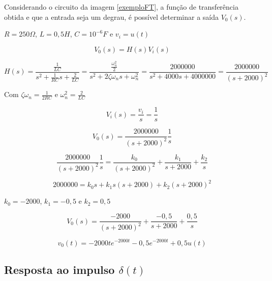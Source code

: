 \documentclass[12pt,fleqn]{book} %
\begin{document}
    \begin{example}

Considerando o circuito da imagem \ref{exemploFT}, a função de transferência obtida e que a entrada seja um degrau, é possível determinar a saída $V_0(s)$.

$R = 250\Omega$, $L=0,5H$, $C=10^{-6}F$ e $v_i = u(t)$

\begin{equation}
V_0(s) = H(s)V_i(s)
\end{equation}

\begin{equation}
H(s) = \frac{\frac{1}{LC}}{s^2+\frac{1}{RC}s+\frac{2}{LC}} = \frac{\frac{\omega_n^2}{2}}{s^2+2\zeta\omega_ns+\omega_n^2} = \frac{2000000}{s^2+4000s+4000000} = \frac{2000000}{(s+2000)^2}
\end{equation}

Com $\zeta\omega_n = \frac{1}{2RC}$ e $\omega_n^2 = \frac{2}{LC}$

\begin{equation}
V_i(s) = \frac{v_i}{s} = \frac{1}{s}
\end{equation}

\begin{equation}
V_0(s) = \frac{2000000}{(s+2000)^2}\frac{1}{s}
\end{equation}

\begin{equation}
\frac{2000000}{(s+2000)^2}\frac{1}{s} = \frac{k_0}{(s+2000)^2}+\frac{k_1}{s+2000} + \frac{k_2}{s}
\end{equation}

\begin{equation}
2000000 = k_0s + k_1s(s+2000) + k_2(s+2000)^2
\end{equation}

$k_0 = -2000$, $k_1 = -0,5$ e $k_2 = 0,5$

\begin{equation}
V_0(s) = \frac{-2000}{(s+2000)^2}+\frac{-0,5}{s+2000} + \frac{0,5}{s}
\end{equation}

\begin{equation}
v_0(t) =-2000te^{-2000t} -0,5e^{-2000t}+0,5u(t)
\end{equation}

\end{example}

\subsection{Resposta ao impulso $\delta(t)$}
\end{document}
